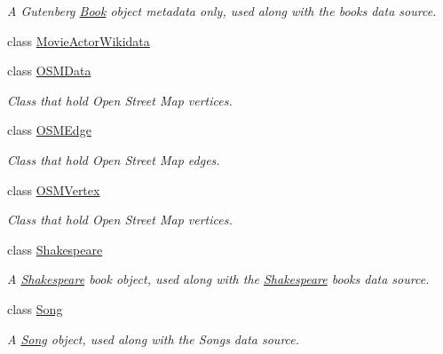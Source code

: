 \begin{DoxyCompactItemize}
\begin{DoxyCompactList}\small\item\em A Gutenberg \hyperlink{classbridges_1_1dataset_1_1_book}{Book} object metadata only, used along with the books data source. \end{DoxyCompactList}\item 
class \hyperlink{classbridges_1_1dataset_1_1_movie_actor_wikidata}{Movie\+Actor\+Wikidata}
\item 
class \hyperlink{classbridges_1_1dataset_1_1_o_s_m_data}{O\+S\+M\+Data}
\begin{DoxyCompactList}\small\item\em Class that hold Open Street Map vertices. \end{DoxyCompactList}\item 
class \hyperlink{classbridges_1_1dataset_1_1_o_s_m_edge}{O\+S\+M\+Edge}
\begin{DoxyCompactList}\small\item\em Class that hold Open Street Map edges. \end{DoxyCompactList}\item 
class \hyperlink{classbridges_1_1dataset_1_1_o_s_m_vertex}{O\+S\+M\+Vertex}
\begin{DoxyCompactList}\small\item\em Class that hold Open Street Map vertices. \end{DoxyCompactList}\item 
class \hyperlink{classbridges_1_1dataset_1_1_shakespeare}{Shakespeare}
\begin{DoxyCompactList}\small\item\em A \hyperlink{classbridges_1_1dataset_1_1_shakespeare}{Shakespeare} book object, used along with the \hyperlink{classbridges_1_1dataset_1_1_shakespeare}{Shakespeare} books data source. \end{DoxyCompactList}\item 
class \hyperlink{classbridges_1_1dataset_1_1_song}{Song}
\begin{DoxyCompactList}\small\item\em A \hyperlink{classbridges_1_1dataset_1_1_song}{Song} object, used along with the Songs data source. \end{DoxyCompactList}\end{DoxyCompactItemize}
